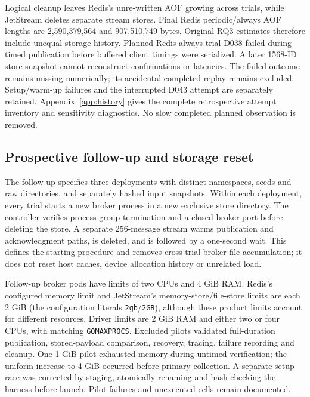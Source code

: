 \documentclass[11pt]{article}
\theoremstyle{definition}
\newcommand{\code}[1]{\texttt{#1}}
\begin{document}
Logical cleanup leaves Redis's unre-written AOF growing across trials, while JetStream deletes separate stream stores. Final Redis periodic/always AOF lengths are 2,590,379,564 and 907,510,749 bytes. Original RQ3 estimates therefore include unequal storage history. Planned Redis-always trial D038 failed during timed publication before buffered client timings were serialized. A later 1568-ID store snapshot cannot reconstruct confirmations or latencies. The failed outcome remains missing numerically; its accidental completed replay remains excluded. Setup/warm-up failures and the interrupted D043 attempt are separately retained. Appendix~\ref{app:history} gives the complete retrospective attempt inventory and sensitivity diagnostics. No slow completed planned observation is removed.

\subsection{Prospective follow-up and storage reset}\label{sec:followup-method}

The follow-up specifies three deployments with distinct namespaces, seeds and raw directories, and separately hashed input snapshots. Within each deployment, every trial starts a new broker process in a new exclusive store directory. The controller verifies process-group termination and a closed broker port before deleting the store. A separate 256-message stream warms publication and acknowledgment paths, is deleted, and is followed by a one-second wait. This defines the starting procedure and removes cross-trial broker-file accumulation; it does not reset host caches, device allocation history or unrelated load.

Follow-up broker pods have limits of two CPUs and 4 GiB RAM. Redis's configured memory limit and JetStream's memory-store/file-store limits are each 2 GiB (the configuration literals \code{2gb}/\code{2GB}), although these product limits account for different resources. Driver limits are 2 GiB RAM and either two or four CPUs, with matching \code{GOMAXPROCS}. Excluded pilots validated full-duration publication, stored-payload comparison, recovery, tracing, failure recording and cleanup. One 1-GiB pilot exhausted memory during untimed verification; the uniform increase to 4 GiB occurred before primary collection. A separate setup race was corrected by staging, atomically renaming and hash-checking the harness before launch. Pilot failures and unexecuted cells remain documented.
\end{document}
